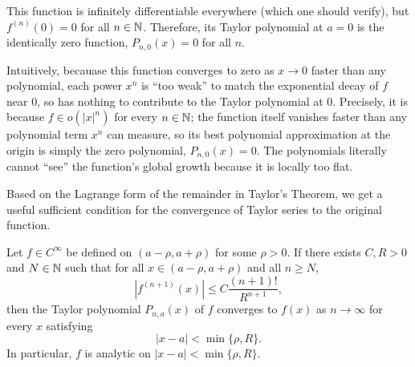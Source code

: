 \documentclass[../analysis1.tex]{subfiles}
\begin{document}
\begin{example}
\begin{center}
      \end{center}
    
    This function is infinitely differentiable everywhere (which one should verify), but $f^{(n)}(0) = 0$ for all $n \in \mathbb{N}$. Therefore, its Taylor polynomial at $a=0$ is the identically zero function, $P_{n,0}(x) = 0$ for all $n$.

    Intuitively, becauase this function converges to zero as $x\to 0$ faster than any polynomial, each power $x^n$ is ``too weak'' to match the exponential decay of $f$ near 0, so has nothing to contribute to the Taylor polynomial at 0. Precisely, it is because $f\in o(|x|^n)$ for every $n\in\mathbb{N}$; the function itself vanishes faster than any polynomial term $x^n$ can measure, so its best polynomial approximation at the origin is simply the zero polynomial, $P_{n,0}(x) = 0$. The polynomials literally cannot ``see'' the function's global growth because it is locally too flat.
\end{example}

Based on the Lagrange form of the remainder in Taylor's Theorem, we get a useful sufficient condition for the convergence of Taylor series to the original function.

\begin{theorem}
    \begin{shaded*}
        Let $f\in C^{\infty}$ be defined on $(a-\rho, a+\rho)$ for some $\rho>0$. If there exists $C,R > 0$ and $N\in\mathbb{N}$ such that for all $x \in (a-\rho, a+\rho)$ and all $n \ge N$,
        \[
            |f^{(n+1)}(x)| \le C \frac{(n+1)!}{R^{n+1}},
        \]
        then the Taylor polynomial $P_{n,a}(x)$ of $f$ converges to $f(x)$ as $n\to\infty$ for every $x$ satisfying \[|x-a|<\min\{\rho,R\}.\]
        In particular, $f$ is analytic on $|x-a|<\min\{\rho,R\}$.
    \end{shaded*}
\end{theorem}
\end{document}

